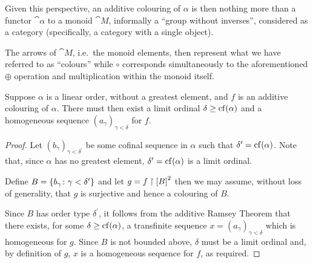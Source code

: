 Given this perspective, an additive colouring of $\alpha$ is then nothing more
than a functor $\cat{\alpha}$ to a monoid $\cat{M}$, informally a ``group
without inverses'', considered as a category (specifically, a category with a
single object).

The arrows of $\cat{M}$, i.e.\ the monoid elements, then represent what we have
referred to as ``colours'' while $\circ$ corresponds simultaneously to the
aforementioned $\oplus$ operation and multiplication within the monoid itself.

\begin{cor}
	Suppose $\alpha$ is a linear order, without a greatest element, and $f$ is
	an additive colouring of $\alpha$. There must then exist a limit ordinal
	$\delta\geq\cf(\alpha)$ and a homogeneous sequence
	$(a_\gamma)_{\gamma<\delta}$ for $f$.
\end{cor}

\begin{proof}
	Let $(b_\gamma)_{\gamma<\delta^\prime}$ be some cofinal sequence in $\alpha$
	such that $\delta^\prime=\cf(\alpha)$.  Note that, since $\alpha$ has no
	greatest element, $\delta^\prime=\cf(\alpha)$ is a limit ordinal.

	Define $B=\setbuild{b_\gamma}{\gamma<\delta^\prime}$ and let
	$g=f\restriction{\subsets{2}{B}}$ then we may assume, without loss of
	generality, that $g$ is surjective and hence a colouring of $B$.

	Since $B$ has order type $\delta^\prime$, it follows from the additive
	Ramsey Theorem that there exists, for some $\delta\geq\cf(\alpha)$, a
	transfinite sequence $x=(a_\gamma)_{\gamma<\delta}$ which is homogeneous for
	$g$.  Since $B$ is not bounded above, $\delta$ must be a limit ordinal and,
	by definition of $g$, $x$ is a homogeneous sequence for $f$, as required.
\end{proof}



